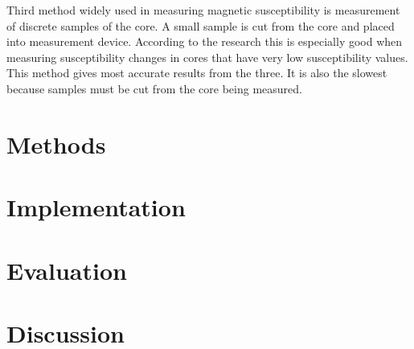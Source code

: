 \documentclass[12pt,a4paper,oneside,pdftex]{report}
\begin{document}
Third method widely used in measuring magnetic susceptibility is measurement
of discrete samples of the core. A small sample is cut from the
core and placed into measurement device. According to the research\cite{Nowaczyk2001} this
is especially good when measuring susceptibility changes in cores that have
very low susceptibility values. This method gives most accurate results from
the three. It is also the slowest because samples must be cut from the core
being measured.\cite{Nowaczyk2001}










% 

% 

\chapter{Methods}
\label{chapter:methods}

% 

\chapter{Implementation}
\label{chapter:implementation}

% 

\chapter{Evaluation}
\label{chapter:evaluation}

% 

\chapter{Discussion}
\label{chapter:discussion}
\end{document}
